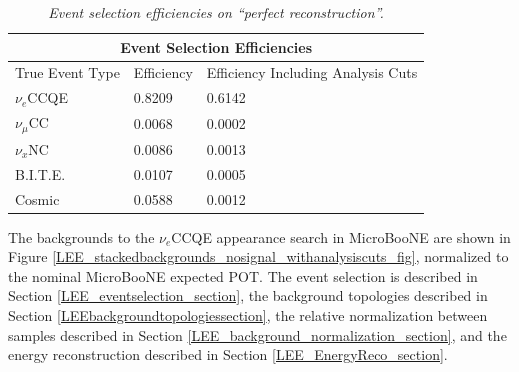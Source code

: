 \begin{table}
\begin{tabular}{ |p{4cm}|p{3cm}|p{6cm}|  }
 \hline
 \multicolumn{3}{|c|}{Event Selection Efficiencies} \\
 \hline
 True Event Type & Efficiency & Efficiency Including Analysis Cuts \\
 \hline \hline
 $\nu_e$CCQE & 0.8209 & 0.6142\\\hline
 
 $\nu_\mu$CC & 0.0068 & 0.0002\\\hline

 $\nu_x$NC & 0.0086 & 0.0013\\\hline

 B.I.T.E. & 0.0107 & 0.0005 \\\hline

 Cosmic & 0.0588 & 0.0012\\\hline

 \hline
\end{tabular}
\caption{\textit{Event selection efficiencies on ``perfect reconstruction''.}}\label{eventselection_efficiency_table}
\end{table}



The backgrounds to the $\nu_e$CCQE appearance search in MicroBooNE are shown in Figure \ref{LEE_stackedbackgrounds_nosignal_withanalysiscuts_fig}, normalized to the nominal MicroBooNE expected POT. The event selection is described in Section \ref{LEE_eventselection_section}, the background topologies described in Section \ref{LEEbackgroundtopologiessection}, the relative normalization between samples described in Section \ref{LEE_background_normalization_section}, and the energy reconstruction described in Section \ref{LEE_EnergyReco_section}.


